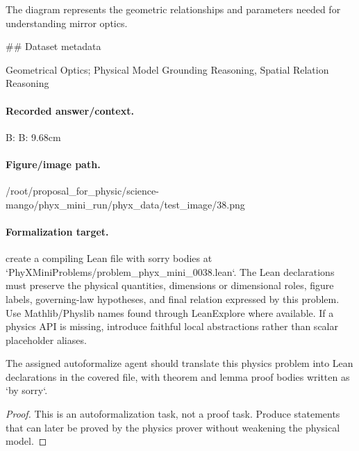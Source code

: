 The diagram represents the geometric relationships and parameters needed for understanding mirror optics.

\#\# Dataset metadata

Geometrical Optics; Physical Model Grounding Reasoning, Spatial Relation Reasoning

\paragraph{Recorded answer/context.}
B: B: 9.68cm

\paragraph{Figure/image path.}
/root/proposal\_for\_physic/science-mango/phyx\_mini\_run/phyx\_data/test\_image/38.png

\paragraph{Formalization target.}
create a compiling Lean file with sorry bodies at `PhyXMiniProblems/problem\_phyx\_mini\_0038.lean`. The Lean declarations must preserve the physical quantities, dimensions or dimensional roles, figure labels, governing-law hypotheses, and final relation expressed by this problem.
Use Mathlib/Physlib names found through LeanExplore where available. If a physics API is missing, introduce faithful local abstractions rather than scalar placeholder aliases.

\begin{theorem}
\label{thm:physics:phyx_mini_0038:target}
The assigned autoformalize agent should translate this physics problem into Lean declarations in the covered file, with theorem and lemma proof bodies written as `by sorry`.
\end{theorem}
\begin{proof}
This is an autoformalization task, not a proof task. Produce statements that can later be proved by the physics prover without weakening the physical model.
\end{proof}

